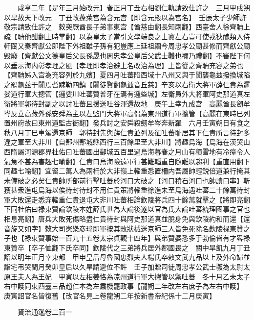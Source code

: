 　　咸亨二年【是年三月始改元】春正月丁丑右相劉仁軌請致仕許之　三月甲戍朔以旱赦天下改元　丁丑改蓬萊宫為含元宫【即含元殿以為宫名】　壬辰太子少師許敬宗請致仕許之　敕突厥酋長子弟事東宫【酋慈由翻長知兩翻】西臺舍人徐齊聃上疏【聃他酣翻上時掌翻】以為皇太子當引文學端良之士寘左右豈可使戎狄醜類入侍軒闥又奏齊獻公即陛下外祖雖子孫有犯豈應上延祖禰今周忠孝公廟甚修而齊獻公廟毁廢【齊獻公文德皇后父長孫晟也周忠孝公皇后父武士彠也襧乃禮翻】不審陛下何以垂示海内彰孝理之風【孝理即孝治避上名改治為理】上皆從之齊聃充容之弟也【齊聃姊入宫為充容列於九嬪】夏四月吐蕃陷西域十八州又與于闐襲龜兹撥換城陷之罷龜兹于闐焉耆踈勒四鎮【闐徒賢翻龜兹音丘慈】辛亥以右衛大將軍薛仁貴為邏娑道行軍大摠管【邏娑川吐蕃贊普牙在焉有邏些城】左衛員外大將軍阿史那道真左衛將軍郭待封副之以討吐蕃且援送吐谷渾還故地　庚午上幸九成宫　高麗酋長劒牟岑反立高藏外孫安舜為主以左監門大將軍高侃為東州道行軍摠管【高麗在東時巳列置州府故曰東州道監古衘翻】發兵討之安舜殺劒牟岑奔新羅　六月壬寅朔日有食之　秋八月丁巳車駕還京師　郭待封先與薛仁貴並列及征吐蕃耻居其下仁貴所言待封多違之軍至大非川【自鄯州鄯城縣西行三百餘里至大非川】將趣烏海【烏海在漢哭山西隋屬河源郡界杜佑曰吐蕃國出鄯城五百里過烏海暮春之月山有積雪地有冷瘴令人氣急不甚為害趣七喻翻】仁貴曰烏海險遠軍行甚難輜重自隨難以趨利【重直用翻下同趣七喻翻】宜留二萬人為兩柵於大非嶺上輜重悉置柵内吾屬帥輕鋭倍道兼行掩其未備破之必矣仁貴帥所部前行擊吐蕃於河口大破之【河口積石河口也帥讀曰率】斬獲甚衆進屯烏海以俟待封待封不用仁貴策將輜重徐進未至烏海遇吐蕃二十餘萬待封軍大敗還走悉弃輜重仁貴退屯大非川吐蕃相論欽陵將兵四十餘萬就擊之【將即亮翻下同杜佑曰禄東贊論欽陵本姓薛氏世為大論後遂以官為氏大論吐蕃統理國事之官也相息亮翻】唐兵大敗死傷略盡仁貴待封與阿史那道真並脫身免與欽陵約和而還【還音旋又如字】敕大司憲樂彦瑋即軍按其敗狀械送京師三人皆免死除名欽陵禄東贊之子也【禄東贊事始一百九十五卷太宗貞觀十四年】與弟贊婆悉多于勃倫皆有才畧禄東贊卒【卒子恤翻下氏卒同】欽陵代之三弟將兵居外鄰國畏之　關中旱飢九月丁丑詔以明年正月幸東都　甲申皇后母魯國忠烈夫人楊氏卒敕文武九品以上及外命婦並詣宅弔哭閏月癸卯皇后以久旱請避位不許　壬子加贈司徒周忠孝公武士彠為太尉太原王夫人為王妃　甲寅以左相姜恪為凉州道行軍大摠管以禦吐蕃　冬十月乙未太子右中護同東西臺三品趙仁本為左肅機罷政事【龍朔二年改左右庶子為左右中護】　庚寅詔官名皆復舊【改官名見上卷龍朔二年按新書帝紀係十二月庚寅】

　　資治通鑑卷二百一


    


 


 



 

